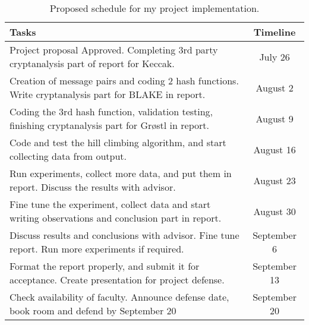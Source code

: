 \begin{table}[h]
  \begin{center}
    \begin{tabular}{ | p{11.5cm} | c | } \hline
      Tasks                                                                                                   & Timeline \\ \hline
      Project proposal Approved. Completing 3rd party cryptanalysis part of report for Keccak.                & July 26 \\ \hline
      Creation of message pairs and coding 2 hash functions. Write cryptanalysis part for BLAKE in report.    & August 2 \\ \hline
      Coding the 3rd hash function, validation testing, finishing cryptanalysis part for Gr{\o}stl in report. & August 9 \\ \hline
      Code and test the hill climbing algorithm, and start collecting data from output.                       & August 16 \\ \hline
      Run experiments, collect more data, and put them in report. Discuss the results with advisor.           & August 23 \\ \hline
      Fine tune the experiment, collect data and start writing observations and conclusion part in report.    & August 30 \\ \hline
      Discuss results and conclusions with advisor. Fine tune report. Run more experiments if required.       & September 6 \\ \hline
      Format the report properly, and submit it for acceptance. Create presentation for project defense.      & September 13 \\ \hline
      Check availability of faculty. Announce defense date, book room and defend by September 20              & September 20 \\ \hline
    \end{tabular}
  \caption{Proposed schedule for my project implementation.}
  \end{center}
\end{table}

